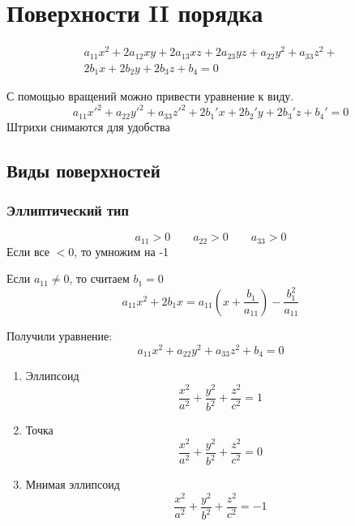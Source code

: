 \documentclass[main]{subfiles}
\begin{document}
\chapter{Поверхности II порядка}
\begin{multline*}
    a_{11} x^2 + 2 a_{12} xy + 2 a_{13} xz + 2 a_{23} yz + a_{22} y^2 + a_{33}z^2 +\\
    2b_1x +2 b_2y + 2b_3z + b_4 = 0
\end{multline*}
\begin{theorem}
    С помощью вращений можно привести уравнение к виду.
    \[a_{11} x'^2 + a_{22} y'^2 + a_{33}z'^2 + 2b_1'x +2 b_2'y + 2b_3'z + b_4' = 0\]
    Штрихи снимаются для удобства
\end{theorem}

\section{Виды поверхностей}
\subsection{Эллиптический тип}
\[a_{11} > 0 \qquad a_{22} > 0 \qquad a_{33} > 0\]
Если все $<0$, то умножим на -1

\begin{lemma}
    Если $a_{11} \neq 0$, то считаем $b_1 = 0$
    \[a_{11} x^2 + 2b_1 x = a_{11} \left(x + \frac{b_1}{a_{11}}\right) - \frac{b_1^2}{a_{11}}\]
\end{lemma}

Получили уравнение:
\[a_{11}x^2 + a_{22}y^2 + a_{33}z^2 + b_4 = 0\]
\begin{enumerate}
    \item Эллипсоид
          \[\frac{x^2}{a^2} + \frac{y^2}{b^2} + \frac{z^2}{c^2} = 1\]
    \item Точка
          \[\frac{x^2}{a^2} + \frac{y^2}{b^2} + \frac{z^2}{c^2} = 0\]
    \item Мнимая эллипсоид
          \[\frac{x^2}{a^2} + \frac{y^2}{b^2} + \frac{z^2}{c^2} = -1\]
\end{enumerate}
\end{document}
